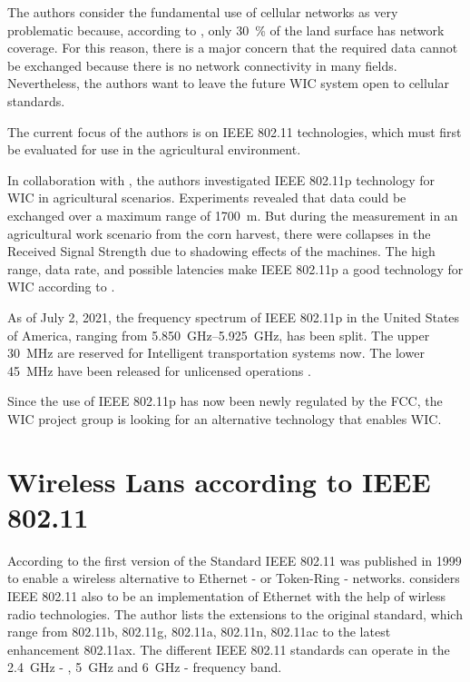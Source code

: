 \documentclass[]{nsm-thesis}
\begin{document}
The authors consider the fundamental use of cellular networks as very problematic because, according to \cite{noauthor_ict_2016}, only \SI{30}{\percent} of the land surface has network coverage. For this reason, there is a major concern that the required data cannot be exchanged because there is no network connectivity in many fields. Nevertheless, the authors want to leave the future \ac{WIC} system open to cellular standards.

The current focus of the authors is on IEEE 802.11 technologies, which must first be evaluated for use in the agricultural environment.

In collaboration with \textcite{klingler_agriculture_2018}, the authors investigated IEEE 802.11p technology for \ac{WIC} in agricultural scenarios. Experiments revealed that data could be exchanged over a maximum range of \SI{1700}{\metre}. But during the measurement in an agricultural work scenario from the corn harvest, there were collapses in the Received Signal Strength due to shadowing effects of the machines. The high range, data rate, and possible latencies make IEEE 802.11p a good technology for \ac{WIC} according to \textcite{schlingmann_challenges_2017}.

As of July 2, 2021, the frequency spectrum of IEEE 802.11p in the United States of America, ranging from \SIrange{5,850}{5,925}{\giga\hertz}, has been split. The upper \SI{30}{\mega\hertz} are reserved for Intelligent transportation systems now. The lower \SI{45}{\mega\hertz} have been released for unlicensed operations \cite{noauthor_use_2021}.

Since the use of IEEE 802.11p has now been newly regulated by the FCC, the \ac{WIC} project group is looking for an alternative technology that enables \ac{WIC}.

\section{Wireless Lans according to IEEE 802.11}
According to \textcite{kauffels_wireless_2002} the first version of the Standard IEEE 802.11 was published in 1999 to enable a wireless alternative to Ethernet - or Token-Ring - networks.
\textcite{sauter_wireless_2022} considers IEEE 802.11 also to be an implementation of Ethernet with the help of wirless radio technologies. The author lists the extensions to the original standard, which range from 802.11b, 802.11g, 802.11a, 802.11n, 802.11ac to the latest enhancement 802.11ax. The different IEEE 802.11 standards can operate in the  \SI{2.4}{\giga\hertz} - , \SI{5}{\giga\hertz} and \SI{6}{\giga\hertz} - frequency band. 
\end{document}

